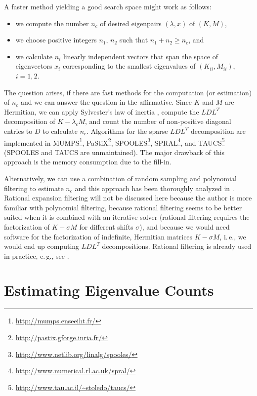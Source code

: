 \documentclass[%
	paper=a4,
	fontsize=10pt,
	DIV11,BCOR10mm,
	numbers=noenddot,
	abstract=yes
]{scrartcl}
\theoremstyle{definition}
\begin{document}
A faster method yielding a good search space might work as follows:
\begin{itemize}
	\item we compute the number $n_c$ of desired eigenpairs $(\lambda, x)$ of $(K, M)$,
	\item we choose positive integers $n_1$, $n_2$ such that $n_1+n_2 \geq n_c$,
		and
	\item we calculate $n_i$ linearly independent vectors that span the space of
		eigenvectors $x_i$ corresponding to the smallest eigenvalues of
		$(K_{ii}, M_{ii})$, $i = 1, 2$.
\end{itemize}
The question arises, if there are fast methods for the computation (or
estimation) of $n_c$ and we can answer the question in the affirmative. Since
$K$ and $M$ are Hermitian, we can apply Sylvester's law of inertia
\cite[Theorem~4.5.8]{Golub2012}, compute the $LDL^T$ decomposition of $K -
\lambda_c M$, and count the number of non-positive diagonal entries to $D$ to
calculate $n_c$. Algorithms for the sparse $LDL^T$ decomposition are implemented
in MUMPS\footnote{\url{http://mumps.enseeiht.fr/}},
PaStiX\footnote{\url{http://pastix.gforge.inria.fr/}},
SPOOLES\footnote{\url{http://www.netlib.org/linalg/spooles/}},
SPRAL\footnote{\url{http://www.numerical.rl.ac.uk/spral/}}, and
TAUCS\footnote{\url{http://www.tau.ac.il/~stoledo/taucs/}} (SPOOLES and TAUCS are
unmaintained). The major drawback of this approach is the memory consumption due
to the fill-in.

Alternatively, we can use a combination of random sampling and polynomial
filtering to estimate $n_c$ and this approach has been thoroughly analyzed in
\cite{DiNapoli2016}. Rational expansion filtering will not be discussed here
because the author is more familiar with polynomial filtering, because rational
filtering seems to be better suited when it is combined with an iterative solver
(rational filtering requires the factorization of $K - \sigma M$ for different
shifts $\sigma$), and because we would need software for the factorization of
indefinite, Hermitian matrices $K - \sigma M$, i.\,e., we would end up computing
$LDL^T$ decompositions. Rational filtering is already used in practice, e.\,g.,
see \cite{Polizzi2009}.



\section{Estimating Eigenvalue Counts}
\end{document}
